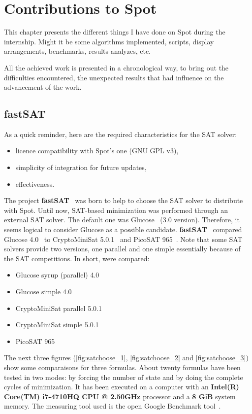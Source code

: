 \chapter{Contributions to Spot}

This chapter presents the different things I have done on Spot during the internship. Might it be
some algorithms implemented, scripts, display arrangements, benchmarks, results analyzes, etc.

\noindent All the achieved work is presented in a chronological way, to bring out the difficulties
encountered, the unexpected results that had influence on the advancement of the work.

\section{fastSAT}
As a quick reminder, here are the required characteristics for the SAT solver:
\begin{itemize}
 \item licence compatibility with Spot's one (GNU GPL v3),
 \item simplicity of integration for future updates,
 \item effectiveness.
\end{itemize}

\noindent The project \textbf{fastSAT}~\cite{5} was born to help to choose the SAT solver to distribute with
Spot. Until now, SAT-based minimization was performed through an external SAT solver. The default one
was Glucose~\cite{12} (3.0 version). Therefore, it seems logical to consider Glucose as a possible
candidate. \textbf{fastSAT}~\cite{5} compared Glucose 4.0~\cite{12} to CryptoMiniSat 5.0.1~\cite{20} and
PicoSAT 965~\cite{21}. Note that some SAT solvers provide two versions, one parallel and one simple
essentially because of the SAT competitions. In short, were compared:
\begin{itemize}
 \item Glucose syrup (parallel) 4.0
 \item Glucose simple 4.0
 \item CryptoMiniSat parallel 5.0.1
 \item CryptoMiniSat simple 5.0.1
 \item PicoSAT 965
\end{itemize}

The next three figures (\ref{fig:satchoose_1}, \ref{fig:satchoose_2} and \ref{fig:satchoose_3}) show some
comparaisons for three formulas. About twenty formulas have been tested in two modes: by forcing the number
of state and by doing the complete cycles of minimization. It has been executed on a computer with an
\textbf{Intel(R) Core(TM) i7-4710HQ CPU @ 2.50GHz} processor and  a \textbf{8 GiB} system memory.
The measuring tool used is the open Google Benchmark tool~\cite{22}.

